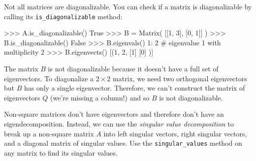 		
Not all matrices are diagonalizable.
You can check if a matrix is diagonalizable by calling its \texttt{is\_diagonalizable} method:

\small
\begin{verbatimtab}
>>> A.is_diagonalizable()
True
>>> B = Matrix( [[1, 3],
  	         [0, 1]] )
>>> B.is_diagonalizable()
False
>>> B.eigenvals()
{1: 2}              # eigenvalue 1 with multiplicity 2
>>> B.eigenvects()
[(1, 2,  [1]
         [0]  )]
\end{verbatimtab}
\normalsize

\noindent
The matrix $B$ is not diagonalizable because it doesn't have a full set of eigenvectors.
To diagonalize a $2\times 2$ matrix, we need two orthogonal eigenvectors but $B$ has only a single eigenvector.
Therefore, we can't construct the matrix of eigenvectors $Q$ (we're missing a column!) 
and so $B$ is not diagonalizable.

Non-square matrices don't have eigenvectors and therefore don't have an eigendecomposition.
Instead, we can use the \emph{singular value decomposition} to break up a non-square matrix $A$ into 
left singular vectors,
right singular vectors, 
and a diagonal matrix of singular values.
Use the \texttt{singular\_values} method on any matrix to find its singular values.



%


